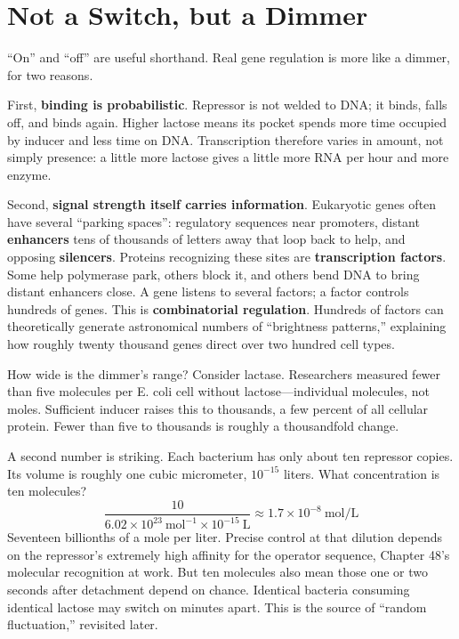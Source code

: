\section{Not a Switch, but a Dimmer}

``On'' and ``off'' are useful shorthand. Real gene regulation is more like a dimmer, for two reasons.

First, \textbf{binding is probabilistic}. Repressor is not welded to DNA; it binds, falls off, and binds again. Higher lactose means its pocket spends more time occupied by inducer and less time on DNA. Transcription therefore varies in amount, not simply presence: a little more lactose gives a little more RNA per hour and more enzyme.

Second, \textbf{signal strength itself carries information}. Eukaryotic genes often have several ``parking spaces'': regulatory sequences near promoters, distant \textbf{enhancers} tens of thousands of letters away that loop back to help, and opposing \textbf{silencers}. Proteins recognizing these sites are \textbf{transcription factors}. Some help polymerase park, others block it, and others bend DNA to bring distant enhancers close. A gene listens to several factors; a factor controls hundreds of genes. This is \textbf{combinatorial regulation}. Hundreds of factors can theoretically generate astronomical numbers of ``brightness patterns,'' explaining how roughly twenty thousand genes direct over two hundred cell types.

\begin{qiaoliang}
How wide is the dimmer's range? Consider lactase. Researchers measured fewer than five molecules per E. coli cell without lactose---individual molecules, not moles. Sufficient inducer raises this to thousands, a few percent of all cellular protein. Fewer than five to thousands is roughly a thousandfold change.

A second number is striking. Each bacterium has only about ten repressor copies. Its volume is roughly one cubic micrometer, $10^{-15}$ liters. What concentration is ten molecules?
\[
\frac{10}{6.02\times 10^{23}\ \mathrm{mol^{-1}}\times 10^{-15}\ \mathrm{L}}\approx 1.7\times 10^{-8}\ \mathrm{mol/L}
\]
Seventeen billionths of a mole per liter. Precise control at that dilution depends on the repressor's extremely high affinity for the operator sequence, Chapter 48's molecular recognition at work. But ten molecules also mean those one or two seconds after detachment depend on chance. Identical bacteria consuming identical lactose may switch on minutes apart. This is the source of ``random fluctuation,'' revisited later.
\end{qiaoliang}

